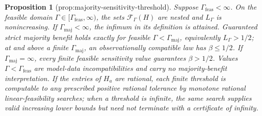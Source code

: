 \documentclass{article}
\newtheorem{proposition}{Proposition}
\begin{document}
\begin{proposition}[prop:majority-sensitivity-threshold]\label{prop:majority-sensitivity-threshold}
Suppose \(\Gamma_{\mathrm{feas}}<\infty\). On the feasible domain \(\Gamma\in[\Gamma_{\mathrm{feas}},\infty)\), the sets \(\mathcal F_{\Gamma}(H)\) are nested and \(L_{\Gamma}\) is nonincreasing. If \(\Gamma_{\mathrm{maj}}<\infty\), the infimum in its definition is attained. Guaranteed strict majority benefit holds exactly for feasible \(\Gamma<\Gamma_{\mathrm{maj}}\), equivalently \(L_{\Gamma}>1/2\); at and above a finite \(\Gamma_{\mathrm{maj}}\), an observationally compatible law has \(\beta\le1/2\). If \(\Gamma_{\mathrm{maj}}=\infty\), every finite feasible sensitivity value guarantees \(\beta>1/2\). Values \(\Gamma<\Gamma_{\mathrm{feas}}\) are model-data incompatibilities and carry no majority-benefit interpretation. If the entries of \(H_a\) are rational, each finite threshold is computable to any prescribed positive rational tolerance by monotone rational linear-feasibility searches; when a threshold is infinite, the same search supplies valid increasing lower bounds but need not terminate with a certificate of infinity.
\end{proposition}
\end{document}
